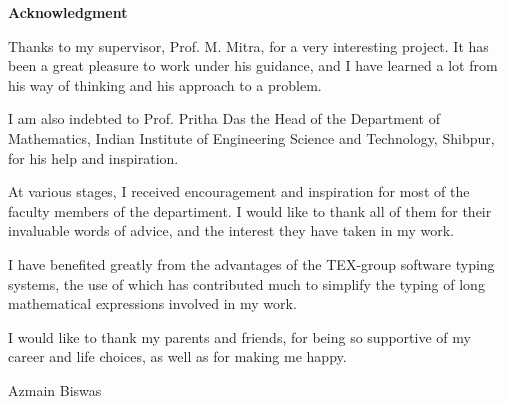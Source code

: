 \vspace{2cm}
\begin{center}
    \LARGE{\textbf{Acknowledgment}}
\end{center}
\vspace{2cm}
    Thanks to my supervisor, Prof. M. Mitra, for a very interesting project. It has been a great pleasure to work under his guidance, and I have learned a lot from his way of thinking and his approach to a problem. 
    \vspace{0.2cm}

    I am also indebted to Prof. Pritha Das the Head of the Department of Mathematics, Indian Institute of Engineering Science and Technology, Shibpur, for his help and inspiration. 
    
    \vspace{0.2cm}
    At various stages, I received encouragement and inspiration for most of the faculty members of the departiment. I would like to thank all of them for their invaluable words of advice, and the interest they have taken in my work.

    \vspace{0.2cm}
    I have benefited greatly from the advantages of the TEX-group software typing systems, the use of which has contributed much to simplify the typing of long mathematical expressions involved in my work.

    \vspace{0.2cm}
    I would like to thank my parents and friends, for being so supportive of my career and life choices, as well as for making me happy.

    \vspace{2cm}
    \begin{flushright}
        Azmain Biswas
    \end{flushright}
